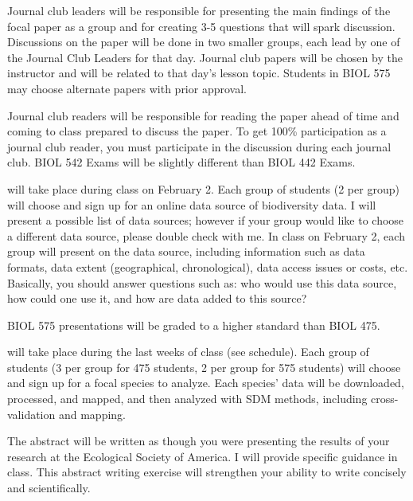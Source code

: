 \documentclass{tufte-handout}
\begin{document}
\begin{fullwidth} 

Journal club leaders will be responsible for presenting the main findings of the focal paper as a group and for creating 3-5 questions that will spark discussion. Discussions on the paper will be done in two smaller groups, each lead by one of the Journal Club Leaders for that day. Journal club papers will be chosen by the instructor and will be related to that day's lesson topic. Students in BIOL 575 may choose alternate papers with prior approval.


Journal club readers will be responsible for reading the paper ahead of time and coming to class prepared to discuss the paper. To get 100\% participation as a journal club reader, you must participate in the discussion during each journal club. BIOL 542 Exams will be slightly different than BIOL 442 Exams. 



 will take place during class on February 2. Each group of students (2 per group) will choose and sign up for an online data source of biodiversity data. I will present a possible list of data sources; however if your group would like to choose a different data source, please double check with me. In class on February 2, each group will present on the data source, including information such as data formats, data extent (geographical, chronological), data access issues or costs, etc. Basically, you should answer questions such as: who would use this data source, how could one use it, and how are data added to this source? 

BIOL 575 presentations will be graded to a higher standard than BIOL 475. 


 will take place during the last weeks of class (see schedule). Each group of students (3 per group for 475 students, 2 per group for 575 students) will choose and sign up for a focal species to analyze. Each species' data will be downloaded, processed, and mapped, and then analyzed with SDM methods, including cross-validation and mapping. 

The abstract will be written as though you were presenting the results of your research at the Ecological Society of America. I will provide specific guidance in class. This abstract writing exercise will strengthen your ability to write concisely and scientifically.


\end{fullwidth}
\end{document}
